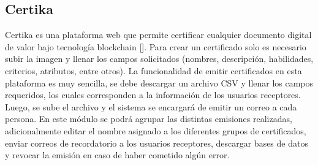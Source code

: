 \subsection{Certika}
Certika es una plataforma web que permite certificar cualquier documento digital de valor bajo tecnología blockchain [\cite{88}]. Para crear un certificado solo es necesario subir la imagen y llenar los campos solicitados (nombres, descripción, habilidades, criterios, atributos, entre otros). La funcionalidad de emitir certificados en esta plataforma es muy sencilla, se debe descargar un archivo CSV y llenar los campos requeridos, los cuales corresponden a la información de los usuarios receptores. Luego, se sube el archivo y el sistema se encargará de emitir un correo a cada persona. En este módulo se podrá agrupar las distintas emisiones realizadas, adicionalmente editar el nombre asignado a los diferentes grupos de certificados, enviar correos de recordatorio a los usuarios receptores, descargar bases de datos y revocar la emisión en caso de haber cometido algún error.


%
%

